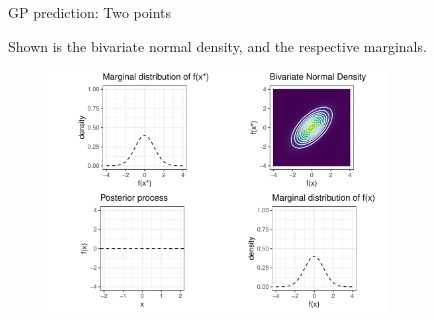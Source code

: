 \begin{vbframe}{GP prediction: Two points}

\begin{footnotesize}
  Shown is the bivariate normal density, and the respective marginals. 
\end{footnotesize}\vspace*{0.2cm}

\begin{figure}
  \includegraphics[width=0.8\textwidth]{figure/gp_pred/1.pdf}
\end{figure}


\end{vbframe}

